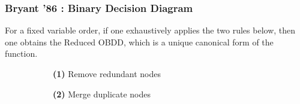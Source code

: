 \documentclass[english, aspectratio=169]{beamer}
\begin{document}
\begin{frame}
  \frametitle{Bryant '86 : Binary Decision Diagram}

  \begin{theorem}
    For a fixed variable order, if one exhaustively applies the two rules below,
    then one obtains the Reduced OBDD, which is a unique canonical form of the
    function.
  \end{theorem}

  \begin{figure}
    \centering

    \begin{subfigure}[b]{0.40\linewidth}
      \centering

      \begin{tikzpicture}[scale=0.9, every node/.style={transform shape}]
        
      \end{tikzpicture}

      \vspace{10pt}
      {\small {\bf (1)} Remove redundant nodes}
    \end{subfigure}
    \begin{subfigure}[b]{0.59\linewidth}
      \centering

      \begin{tikzpicture}[scale=0.9, every node/.style={transform shape}]
        
      \end{tikzpicture}

      \vspace{10pt}
      {\small {\bf (2)} Merge duplicate nodes}
    \end{subfigure}

  \end{figure}

\end{frame}

\blankframe
\end{document}
